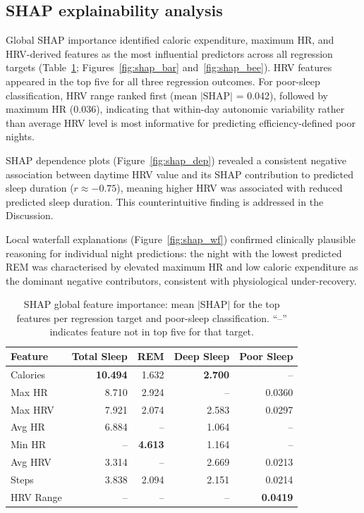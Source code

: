\documentclass[fleqn,10pt]{wlscirep}
\begin{document}
\subsection*{SHAP explainability analysis}
Global SHAP importance identified caloric expenditure, maximum HR, and HRV-derived features as the most influential predictors across all regression targets (Table~\ref{tab:shap}; Figures~\ref{fig:shap_bar} and~\ref{fig:shap_bee}). HRV features appeared in the top five for all three regression outcomes. For poor-sleep classification, HRV range ranked first (mean $|$SHAP$|$ = 0.042), followed by maximum HR (0.036), indicating that within-day autonomic variability rather than average HRV level is most informative for predicting efficiency-defined poor nights.

SHAP dependence plots (Figure~\ref{fig:shap_dep}) revealed a consistent negative association between daytime HRV value and its SHAP contribution to predicted sleep duration ($r \approx -0.75$), meaning higher HRV was associated with reduced predicted sleep duration. This counterintuitive finding is addressed in the Discussion.

Local waterfall explanations (Figure~\ref{fig:shap_wf}) confirmed clinically plausible reasoning for individual night predictions: the night with the lowest predicted REM was characterised by elevated maximum HR and low caloric expenditure as the dominant negative contributors, consistent with physiological under-recovery.

\begin{table}[htbp]
\caption{SHAP global feature importance: mean $|$SHAP$|$ for the top features per regression target and poor-sleep classification. ``--'' indicates feature not in top five for that target.}
\label{tab:shap}
\centering
\small
\begin{tabular}{lrrrr}
\toprule
Feature & Total Sleep & REM & Deep Sleep & Poor Sleep \\
\midrule
Calories      & \textbf{10.494} & 1.632  & \textbf{2.700} & -- \\
Max HR        & 8.710  & 2.924  & --    & 0.0360 \\
Max HRV       & 7.921  & 2.074  & 2.583 & 0.0297 \\
Avg HR        & 6.884  & --     & 1.064 & -- \\
Min HR        & --     & \textbf{4.613}  & 1.164 & -- \\
Avg HRV       & 3.314  & --     & 2.669 & 0.0213 \\
Steps         & 3.838  & 2.094  & 2.151 & 0.0214 \\
HRV Range     & --     & --     & --    & \textbf{0.0419} \\
\bottomrule
\end{tabular}
\end{table}
\end{document}
